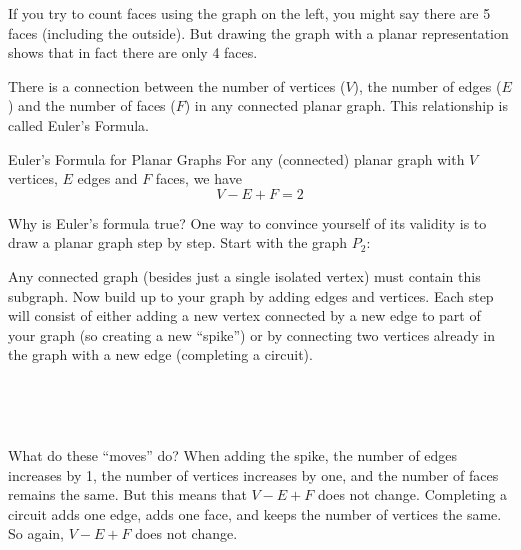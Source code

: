 \documentclass[12pt]{article}
\begin{document}
If you try to count faces using the graph on the left, you might say there are 5 faces (including the outside).  But drawing the graph with a planar representation shows that in fact there are only 4 faces.

There is a connection between the number of vertices ($V$), the number of edges ($E$) and the number of faces ($F$) in any connected planar graph.  This relationship is called Euler's Formula.

\begin{defbox}{Euler's Formula for Planar Graphs}
For any (connected) planar graph with $V$ vertices, $E$ edges and $F$ faces, we have
\[V-E + F = 2\]
\end{defbox}

Why is Euler's formula true?  One way to convince yourself of its validity is to draw a planar graph step by step.  Start with the graph $P_2$:

\begin{center}
\end{center}

Any connected graph (besides just a single isolated vertex) must contain this subgraph.  Now build up to your graph by adding edges and vertices.  Each step will consist of either adding a new vertex connected by a new edge to part of your graph (so creating a new ``spike'') or by connecting two vertices already in the graph with a new edge (completing a circuit).

\begin{center}
  ~ \hfill
  \hfill
  \hfill ~
\end{center}

What do these ``moves'' do?  When adding the spike, the number of edges increases by 1, the number of vertices increases by one, and the number of faces remains the same.  But this means that $V - E + F$ does not change.  Completing a circuit adds one edge, adds one face, and keeps the number of vertices the same.  So again, $V - E + F$ does not change.  
\end{document}
